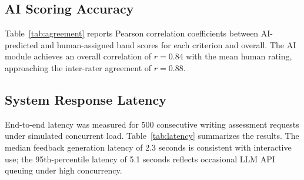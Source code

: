 \documentclass[conference]{IEEEtran}
\begin{document}
\subsection{AI Scoring Accuracy}
Table~\ref{tab:agreement} reports Pearson correlation coefficients between AI-predicted and human-assigned band scores for each criterion and overall. The AI module achieves an overall correlation of $r = 0.84$ with the mean human rating, approaching the inter-rater agreement of $r = 0.88$.

\begin{table}[htbp]
\caption{AI-Human Band Score Agreement (IELTS Writing Task 2, $n=200$)}
\label{tab:agreement}
\centering
{}
\end{table}

\subsection{System Response Latency}
End-to-end latency was measured for 500 consecutive writing assessment requests under simulated concurrent load. Table~\ref{tab:latency} summarizes the results. The median feedback generation latency of 2.3 seconds is consistent with interactive use; the 95th-percentile latency of 5.1 seconds reflects occasional LLM API queuing under high concurrency.

\begin{table}[htbp]
\caption{System Response Latency Under Load}
\label{tab:latency}
\centering
{}
\end{table}
\end{document}
